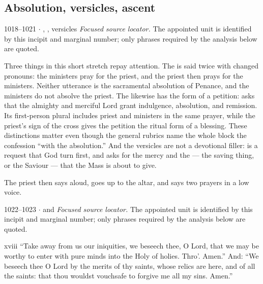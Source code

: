 \subsection*{Absolution, versicles, ascent}

\begin{appointed}{1018--1021 $\cdot$ , , versicles}
\textit{Focused source locator.} The appointed unit is identified by this incipit and marginal number; only phrases required by the analysis below are quoted.
\end{appointed}

Three things in this short stretch repay attention. The 
is said twice with changed pronouns: the ministers pray for the priest, and
the priest then prays for the ministers. Neither utterance is the sacramental
absolution of Penance, and the ministers do not absolve the priest. The
 likewise has the form of a petition:
 asks that the almighty and merciful Lord grant indulgence,
absolution, and remission. Its first-person plural
 includes priest and ministers in the same
prayer, while the priest's sign of the cross gives the petition the ritual
form of a blessing. These distinctions matter even though the general rubrics
name the whole block the confession ``with the absolution.'' And the versicles
are not a devotional filler:  is a request that God turn first, and  asks for the mercy and the
 --- the saving thing, or the Saviour --- that the Mass is
about to give.

The priest then says  aloud, goes up to the altar, and says
two prayers in a low voice.

\begin{appointed}{1022--1023 $\cdot$  and }
\textit{Focused source locator.} The appointed unit is identified by this incipit and marginal number; only phrases required by the analysis below are quoted.
\end{appointed}

\begin{englishwitness}{xviii}
``Take away from us our iniquities, we beseech thee, O Lord, that we may be
worthy to enter with pure minds into the Holy of holies. Thro'. Amen.'' And:
``We beseech thee O Lord by the merits of thy saints, whose relics are here,
and of all the saints: that thou wouldst vouchsafe to forgive me all my sins.
Amen.''
\end{englishwitness}

